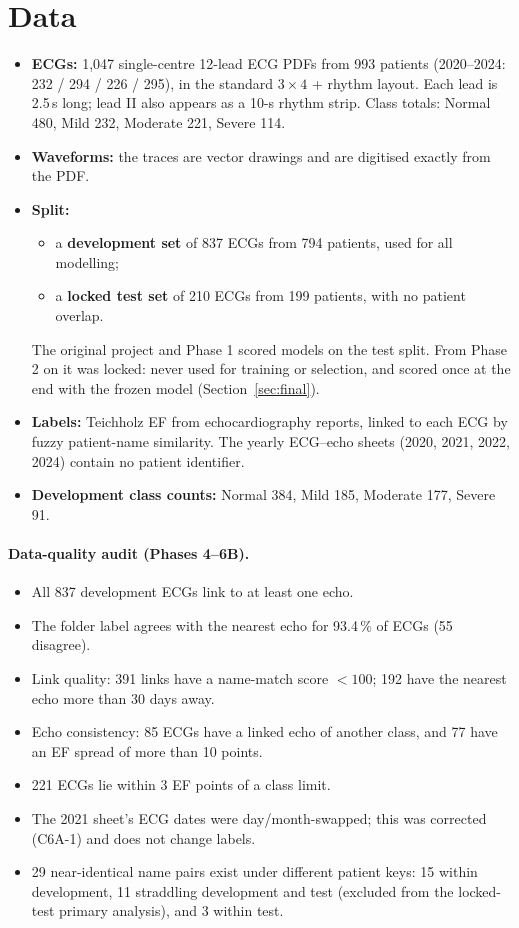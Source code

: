 \section{Data}\label{sec:data}
\begin{itemize}
  \item \textbf{ECGs:} 1,047 single-centre 12-lead ECG PDFs from 993 patients (2020--2024: 232 / 294 / 226 / 295),
    in the standard $3\times4$ + rhythm layout. Each lead is 2.5\,s long; lead II also appears as a 10-s rhythm strip.
    Class totals: Normal 480, Mild 232, Moderate 221, Severe 114.
  \item \textbf{Waveforms:} the traces are vector drawings and are digitised exactly from the PDF.
  \item \textbf{Split:}
    \begin{itemize}
      \item a \textbf{development set} of 837 ECGs from 794 patients, used for all modelling;
      \item a \textbf{locked test set} of 210 ECGs from 199 patients, with no patient overlap.
    \end{itemize}
    The original project and Phase 1 scored models on the test split. From Phase 2 on it was locked: never used for
    training or selection, and scored once at the end with the frozen model (Section~\ref{sec:final}).
  \item \textbf{Labels:} Teichholz EF from echocardiography reports, linked to each ECG by fuzzy patient-name
    similarity. The yearly ECG--echo sheets (2020, 2021, 2022, 2024) contain no patient identifier.
  \item \textbf{Development class counts:} Normal 384, Mild 185, Moderate 177, Severe 91.
\end{itemize}

\paragraph{Data-quality audit (Phases 4--6B).}
\begin{itemize}
  \item All 837 development ECGs link to at least one echo.
  \item The folder label agrees with the nearest echo for 93.4\,\% of ECGs (55 disagree).
  \item Link quality: 391 links have a name-match score $<100$; 192 have the nearest echo more than 30 days away.
  \item Echo consistency: 85 ECGs have a linked echo of another class, and 77 have an EF spread of more than 10 points.
  \item 221 ECGs lie within 3 EF points of a class limit.
  \item The 2021 sheet's ECG dates were day/month-swapped; this was corrected (C6A-1) and does not change labels.
  \item 29 near-identical name pairs exist under different patient keys: 15 within development, 11 straddling
    development and test (excluded from the locked-test primary analysis), and 3 within test.
\end{itemize}

